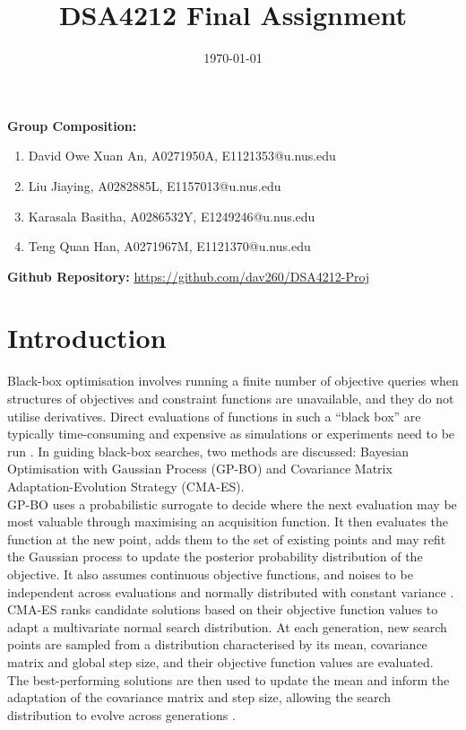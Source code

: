 \documentclass[11pt]{article}
\begin{document}
\title{DSA4212 Final Assignment}
\date{\today}
\maketitle

{\bf Group Composition:}
\begin{enumerate}
\item David Owe Xuan An, A0271950A, E1121353@u.nus.edu
\item Liu Jiaying, A0282885L, E1157013@u.nus.edu
\item Karasala Basitha, A0286532Y, E1249246@u.nus.edu
\item Teng Quan Han, A0271967M, E1121370@u.nus.edu
\end{enumerate}

{\bf Github Repository:} \url{https://github.com/dav260/DSA4212-Proj}

\section{Introduction}

\noindent Black-box optimisation involves running a finite number of objective queries when structures of objectives and constraint functions are unavailable, and they do not utilise derivatives. Direct evaluations of functions in such a “black box” are typically time-consuming and expensive as simulations or experiments need to be run \cite{audet2016blackbox}. In guiding black-box searches, two methods are discussed: Bayesian Optimisation with Gaussian Process (GP-BO) and Covariance Matrix Adaptation-Evolution Strategy (CMA-ES). \\

\noindent GP-BO uses a probabilistic surrogate to decide where the next evaluation may be most valuable through maximising an acquisition function. It then evaluates the function at the new point, adds them to the set of existing points and may refit the Gaussian process to update the posterior probability distribution of the objective. It also assumes continuous objective functions, and noises to be independent across evaluations and normally distributed with constant variance \cite{frazier2018tutorial}.\\

\noindent CMA-ES ranks candidate solutions based on their objective function values to adapt a multivariate normal search distribution. At each generation, new search points are sampled from a distribution characterised by its mean, covariance matrix and global step size, and their objective function values are evaluated. The best-performing solutions are then used to update the mean and inform the adaptation of the covariance matrix and step size, allowing the search distribution to evolve across generations \cite{hansen2023cma}.\\
\end{document}
